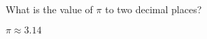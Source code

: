 \question What is the value of $\pi$ to two decimal places?
\begin{solution}
$\pi \approx 3.14$
\end{solution}
